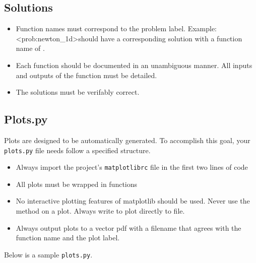 \subsection{Solutions}
\begin{itemize}
\item Function names must correspond to the problem label.  Example: \textless prob:newton\_1d\textgreater should have a corresponding solution with a function name of .
\item Each function should be documented in an unambiguous manner.  All inputs and outputs of the function must be detailed.
\item The solutions must be verifably correct.
\end{itemize}

\subsection{Plots.py}
Plots are designed to be automatically generated.
To accomplish this goal, your \texttt{plots.py} file needs follow a specified structure.
\begin{itemize}
\item Always import the project's \texttt{matplotlibrc} file in the first two lines of code
\item All plots must be wrapped in functions
\item No interactive plotting features of matplotlib should be used.  Never use the  method on a plot.  Always write to plot directly to file.
\item Always output plots to a vector pdf with a filename that agrees with the function name and the plot label.
\end{itemize}
Below is a sample \texttt{plots.py}.




